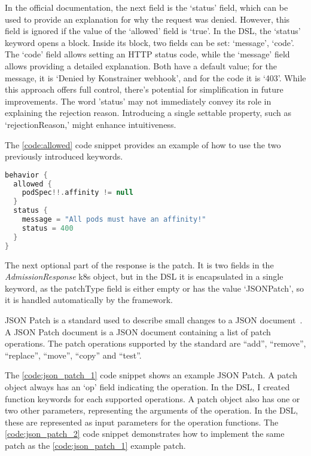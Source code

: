 In the official documentation, the next field is the `status' field, which can be used to provide an explanation for why the request was denied. However, this field is ignored if the value of the `allowed' field is `true'. In the DSL, the `status' keyword opens a block. Inside its block, two fields can be set: `message', `code'. The `code' field allows setting an HTTP status code, while the `message' field allows providing a detailed explanation. Both have a default value; for the message, it is `Denied by Konstrainer webhook', and for the code it is `403'. While this approach offers full control, there's potential for simplification in future improvements. The word 'status' may not immediately convey its role in explaining the rejection reason. Introducing a single settable property, such as `rejectionReason,' might enhance intuitiveness.

The \ref{code:allowed} code snippet provides an example of how to use the two previously introduced keywords.

\begin{lstlisting}[caption={Usage of `allowed' and `status'},language=Kotlin,label=code:allowed]
behavior {
  allowed {
    podSpec!!.affinity != null
  }
  status {
    message = "All pods must have an affinity!"
    status = 400
  }
}
\end{lstlisting}

The next optional part of the response is the patch. It is two fields in the \emph{AdmissionResponse} k8s object, but in the DSL it is encapsulated in a single keyword, as the patchType field is either empty or has the value `JSONPatch', so it is handled automatically by the framework. 

JSON Patch is a standard used to describe small changes to a JSON document~\cite{JSONPatch}. A JSON Patch document is a JSON document containing a list of patch operations. The patch operations supported by the standard are “add”, “remove”, “replace”, “move”, “copy” and “test”.

The \ref{code:json_patch_1} code snippet shows an example JSON Patch. A patch object always has an `op' field indicating the operation. In the DSL, I created function keywords for each supported operations. A patch object also has one or two other parameters, representing the arguments of the operation. In the DSL, these are represented as input parameters for the operation functions. The \ref{code:json_patch_2} code snippet demonstrates how to implement the same patch as the \ref{code:json_patch_1} example patch.

